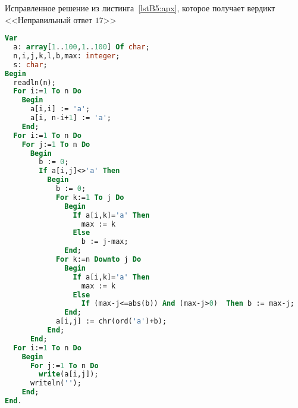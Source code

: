 \begin{algorithm}[!h] 
\caption{Исправленное решение из листинга~\ref{lstB5:apx}, которое получает вердикт <<Неправильный ответ $17$>>}\label{lstB6:apx} 
\begin{lstlisting}[language=pascal, basicstyle=\small]
Var 
  a: array[1..100,1..100] Of char;
  n,i,j,k,l,b,max: integer;
  s: char;
Begin
  readln(n);
  For i:=1 To n Do
    Begin
      a[i,i] := 'a';
      a[i, n-i+1] := 'a';
    End;
  For i:=1 To n Do
    For j:=1 To n Do
      Begin
        b := 0;
        If a[i,j]<>'a' Then
          Begin
            b := 0;
            For k:=1 To j Do
              Begin
                If a[i,k]='a' Then
                  max := k
                Else
                  b := j-max;
              End;
            For k:=n Downto j Do
              Begin
                If a[i,k]='a' Then
                  max := k
                Else
                  If (max-j<=abs(b)) And (max-j>0)  Then b := max-j;
              End;
            a[i,j] := chr(ord('a')+b);
          End;
      End;
  For i:=1 To n Do
    Begin
      For j:=1 To n Do
        write(a[i,j]);
      writeln('');
    End;
End.
\end{lstlisting} 
\end{algorithm}


